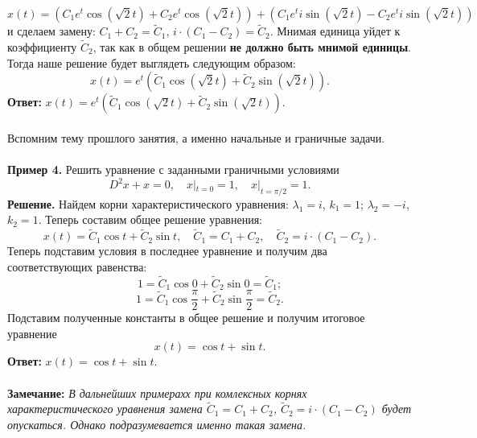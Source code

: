 \documentclass[a4paper, 12pt]{article}
\begin{document}
	$$x(t) = (C_1e^t\cos(\sqrt{2}t) + C_2e^t\cos(\sqrt{2}t)) + (C_1e^ti \sin(\sqrt{2}t) - C_2e^ti \sin(\sqrt{2}t))$$ и сделаем замену: $C_1 + C_2 = \widetilde{C}_1$, $i\cdot(C_1 - C_2) = \widetilde{C}_2$. Мнимая единица уйдет к коэффициенту $\widetilde{C}_2$, так как в общем решении \textbf{не должно быть мнимой единицы}. Тогда наше решение будет выглядеть следующим образом:
	$$x(t) = e^t(\widetilde{C}_1\cos(\sqrt{2}t) + \widetilde{C}_2 \sin(\sqrt{2}t)).$$
	\textbf{Ответ:} $x(t) = e^t(\widetilde{C}_1\cos(\sqrt{2}t) + \widetilde{C}_2 \sin(\sqrt{2}t)).$\\\\
	Вспомним тему прошлого занятия, а именно начальные и граничные задачи.\\\\
	\textbf{Пример 4.} Решить уравнение с заданными граничными условиями $$D^2x + x = 0,\quad x|_{t=0} = 1,\quad x|_{t=\pi/2} = 1.$$
	\textbf{Решение.} Найдем корни характеристического уравнения: $\lambda_1 = i$, $k_1 = 1$; $\lambda_2 = -i$, $k_2 = 1$. Теперь составим общее решение уравнения:$$x(t) = \widetilde{C}_1\cos t + \widetilde{C}_2\sin t,\quad \widetilde{C}_1 = C_1 + C_2,\quad \widetilde{C}_2 = i\cdot (C_1 - C_2).$$
	Теперь подставим условия в последнее уравнение и получим два соответствующих равенства: $$1 = \widetilde{C}_1\cos0 + \widetilde{C}_2\sin0 = \widetilde{C}_1;$$
	$$1 = \widetilde{C}_1\cos\dfrac{\pi}{2} + \widetilde{C}_2\sin\dfrac{\pi}{2} = \widetilde{C}_2.$$
	Подставим полученные константы в общее решение и получим итоговое уравнение $$x(t)=\cos t + \sin t.$$
	\textbf{Ответ:} $x(t)=\cos t + \sin t.$\\\\
	\textbf{Замечание:} \textit{В дальнейших примерахх при комлексных корнях характеристического уравнения замена $\widetilde{C}_1 = C_1 + C_2$, $\widetilde{C}_2 = i\cdot (C_1 - C_2)$ будет опускаться. Однако подразумевается именно такая замена.}
\end{document}

